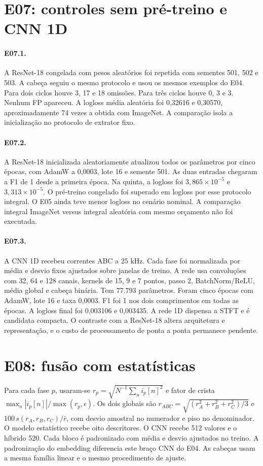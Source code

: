 \documentclass[11pt,a4paper]{article}
\begin{document}
\section{E07: controles sem pré-treino e CNN 1D}
\paragraph{E07.1.} A ResNet-18 congelada com pesos aleatórios foi repetida com sementes 501, 502 e 503. A cabeça seguiu o mesmo protocolo e usou os mesmos exemplos do E04. Para dois ciclos houve 3, 17 e 18 omissões. Para três ciclos houve 0, 3 e 3. Nenhum FP apareceu. A logloss média aleatória foi 0,32616 e 0,30570, aproximadamente 74 vezes a obtida com ImageNet. A comparação isola a inicialização no protocolo de extrator fixo.

\paragraph{E07.2.} A ResNet-18 inicializada aleatoriamente atualizou todos os parâmetros por cinco épocas, com AdamW a 0,0003, lote 16 e semente 501. As duas entradas chegaram a F1 de 1 desde a primeira época. Na quinta, a logloss foi $3{,}865\times10^{-5}$ e $3{,}313\times10^{-5}$. O pré-treino congelado foi superado em logloss por esse protocolo integral. O E05 ainda teve menor logloss no cenário nominal. A comparação integral ImageNet versus integral aleatória com mesmo orçamento não foi executada.

\paragraph{E07.3.} A CNN 1D recebeu correntes ABC a 25 kHz. Cada fase foi normalizada por média e desvio fixos ajustados sobre janelas de treino. A rede usa convoluções com 32, 64 e 128 canais, kernels de 15, 9 e 7 pontos, passo 2, BatchNorm/ReLU, média global e cabeça binária. Tem 77.793 parâmetros. Foram cinco épocas com AdamW, lote 16 e taxa 0,0003. F1 foi 1 nos dois comprimentos em todas as épocas. A logloss final foi 0,003106 e 0,003435. A rede 1D dispensa a STFT e é candidata compacta. O contraste com a ResNet-18 altera arquitetura e representação, e o custo de processamento de ponta a ponta permanece pendente.

\section{E08: fusão com estatísticas}
Para cada fase $p$, usaram-se $r_p=\sqrt{N^{-1}\sum_n i_p[n]^2}$ e fator de crista $\max_n|i_p[n]|/\max(r_p,\epsilon)$. Os dois globais são $r_{ABC}=\sqrt{(r_A^2+r_B^2+r_C^2)/3}$ e $100\,s(r_A,r_B,r_C)/\bar r$, com desvio amostral no numerador e piso no denominador. O modelo estatístico recebe oito descritores. O CNN recebe 512 valores e o híbrido 520. Cada bloco é padronizado com média e desvio ajustados no treino. A padronização do embedding diferencia este braço CNN do E04. As cabeças usam a mesma família linear e o mesmo procedimento de ajuste.
\end{document}
